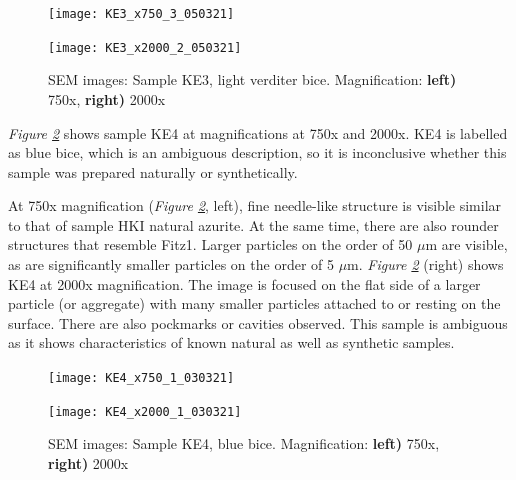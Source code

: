 \begin{figure}[H]
\centering
\begin{minipage}{.45\textwidth}
  \centering
  \texttt{[image: KE3\_x750\_3\_050321]}
\end{minipage}
\begin{minipage}{.45\textwidth}
  \centering
  \texttt{[image: KE3\_x2000\_2\_050321]}
\end{minipage}
\caption[SEM images: Sample KE3, light verditer bice]{SEM images: Sample KE3, light verditer bice. Magnification: \textbf{left)} 750x, \textbf{right)} 2000x}
\label{fig:KE3_sem_1}
\end{figure}


\textit{Figure \ref{fig:KE4_sem_1}} shows sample KE4 at magnifications at 750x and 2000x. KE4 is labelled as blue bice, which is an ambiguous description, so it is inconclusive whether this sample was prepared naturally or synthetically.

At 750x magnification (\textit{Figure \ref{fig:KE4_sem_1}}, left), fine needle-like structure is visible similar to that of sample HKI natural azurite. At the same time, there are also rounder structures that resemble Fitz1. Larger particles on the order of 50 $\mu$m are visible, as are significantly smaller particles on the order of 5 $\mu$m. \textit{Figure \ref{fig:KE4_sem_1}} (right) shows KE4 at 2000x magnification. The image is focused on the flat side of a larger particle (or aggregate) with many smaller particles attached to or resting on the surface. There are also pockmarks or cavities observed. This sample is ambiguous as it shows characteristics of known natural as well as synthetic samples.

\begin{figure}[H]
\centering
\begin{minipage}{.45\textwidth}
  \centering
  \texttt{[image: KE4\_x750\_1\_030321]}
\end{minipage}
\begin{minipage}{.45\textwidth}
  \centering
  \texttt{[image: KE4\_x2000\_1\_030321]}
\end{minipage}
\caption[SEM images: Sample KE4, blue bice]{SEM images: Sample KE4, blue bice. Magnification: \textbf{left)} 750x, \textbf{right)} 2000x}
\label{fig:KE4_sem_1}
\end{figure}



